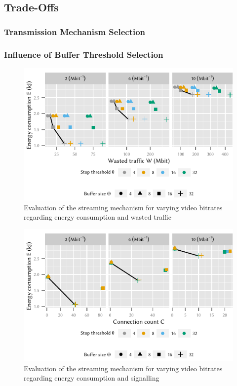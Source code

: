 \subsection{Trade-Offs}\label{sec:application:lte_video:trade_offs}
\subsubsection*{Transmission Mechanism Selection}\label{sec:application:lte_video:trade_offs:mechanism_selection}
\subsubsection*{Influence of Buffer Threshold Selection}\label{sec:application:lte_video:trade_offs:buffer_threshold_influence}

\begin{figure}
  \centering
  \includegraphics{application/lte_video/trade_offs/figures/energy2lostData}
  \caption{Evaluation of the streaming mechanism for varying video bitrates regarding energy consumption and wasted traffic}
  \label{fig:application:lte_video:numerical_evaluation:trade_offs:energy2lostData}
\end{figure}

\begin{figure}
  \centering
  \includegraphics{application/lte_video/trade_offs/figures/energy2connections}
  \caption{Evaluation of the streaming mechanism for varying video bitrates regarding energy consumption and signalling}
  \label{fig:application:lte_video:numerical_evaluation:trade_offs:energy2connections}
\end{figure}

